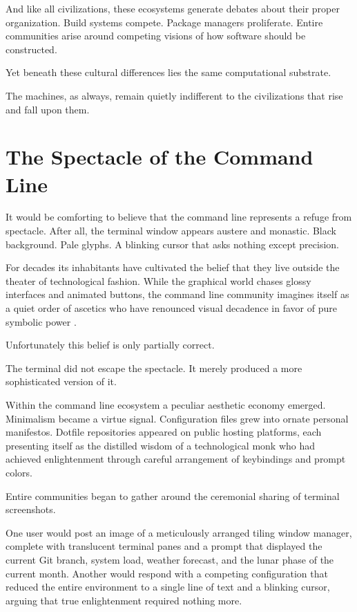\documentclass[11pt]{article}
\theoremstyle{definition}
\begin{document}
And like all civilizations, these ecosystems generate debates about
their proper organization. Build systems compete. Package managers
proliferate. Entire communities arise around competing visions of how
software should be constructed.

Yet beneath these cultural differences lies the same computational
substrate.

The machines, as always, remain quietly indifferent to the
civilizations that rise and fall upon them.

\section{The Spectacle of the Command Line}

It would be comforting to believe that the command line represents a
refuge from spectacle. After all, the terminal window appears austere
and monastic. Black background. Pale glyphs. A blinking cursor that
asks nothing except precision.

For decades its inhabitants have cultivated the belief that they live
outside the theater of technological fashion. While the graphical world
chases glossy interfaces and animated buttons, the command line community
imagines itself as a quiet order of ascetics who have renounced visual
decadence in favor of pure symbolic power \cite{raymond2003}.

Unfortunately this belief is only partially correct.

The terminal did not escape the spectacle. It merely produced a more
sophisticated version of it.

Within the command line ecosystem a peculiar aesthetic economy emerged.
Minimalism became a virtue signal. Configuration files grew into ornate
personal manifestos. Dotfile repositories appeared on public hosting
platforms, each presenting itself as the distilled wisdom of a
technological monk who had achieved enlightenment through careful
arrangement of keybindings and prompt colors.

Entire communities began to gather around the ceremonial sharing of
terminal screenshots.

One user would post an image of a meticulously arranged tiling window
manager, complete with translucent terminal panes and a prompt that
displayed the current Git branch, system load, weather forecast, and
the lunar phase of the current month. Another would respond with a
competing configuration that reduced the entire environment to a single
line of text and a blinking cursor, arguing that true enlightenment
required nothing more.
\end{document}
